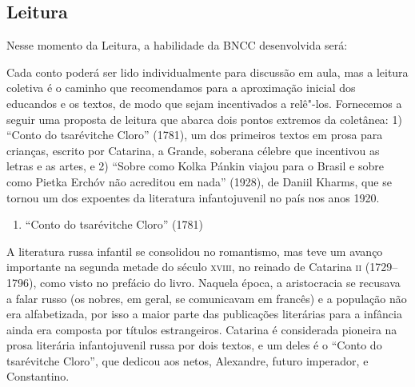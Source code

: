\documentclass[11pt]{extarticle}
\begin{document}
\subsection{Leitura}

Nesse momento da Leitura, a habilidade da BNCC desenvolvida será:

Cada conto poderá ser lido individualmente para discussão em aula, mas a
leitura coletiva é o caminho que recomendamos para a aproximação inicial
dos educandos e os textos, de modo que sejam incentivados a relê"-los.
Fornecemos a seguir uma proposta de leitura que abarca dois pontos
extremos da coletânea: 1) ``Conto do tsarévitche Cloro'' (1781), um dos
primeiros textos em prosa para crianças, escrito por Catarina, a Grande,
soberana célebre que incentivou as letras e as artes, e 2) ``Sobre como
Kolka Pánkin viajou para o Brasil e sobre como Pietka Erchóv não
acreditou em nada'' (1928), de Daniil Kharms, que se tornou um dos
expoentes da literatura infantojuvenil no país nos anos 1920.

\begin{enumerate}
\item ``Conto do tsarévitche Cloro'' (1781)
\end{enumerate}

\reversemarginpar
\marginparwidth=5cm


A literatura russa infantil se consolidou no romantismo, mas teve um
avanço importante na segunda metade do século \textsc{xviii}, no reinado de
Catarina \textsc{ii} (1729--1796), como visto no prefácio do livro. Naquela
época, a aristocracia se recusava a falar russo (os nobres, em geral, se
comunicavam em francês) e a população não era alfabetizada, por isso a
maior parte das publicações literárias para a infância ainda era
composta por títulos estrangeiros. Catarina é considerada pioneira na
prosa literária infantojuvenil russa por dois textos, e um deles é o
``Conto do tsarévitche Cloro'', que dedicou aos netos, Alexandre, futuro
imperador, e Constantino.

\end{document}
